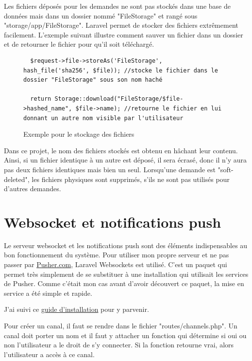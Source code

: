 \documentclass[
    iai, %
    eai, %
]{heig-tb}
\begin{document}
\newpage
Les fichiers déposés pour les demandes ne sont pas stockés dans une base de données mais dans un dossier nommé "FileStorage" et rangé sous "storage/app/FileStorage". Laravel permet de stocker des fichiers extrêmement facilement. L'exemple suivant illustre comment sauver un fichier dans un dossier et de retourner le fichier pour qu'il soit téléchargé.

\begin{figure}[h]
  \begin{verbatim}
  $request->file->storeAs('FileStorage', hash_file('sha256', $file)); //stocke le fichier dans le dossier "FileStorage" sous son nom haché

  return Storage::download("FileStorage/$file->hashed_name", $file->name); //retourne le fichier en lui donnant un autre nom visible par l'utilisateur
  \end{verbatim}
  \caption{Exemple pour le stockage des fichiers}
\end{figure}

Dans ce projet, le nom des fichiers stockés est obtenu en hâchant leur contenu. Ainsi, si un fichier identique à un autre est déposé, il sera écrasé, donc il n'y aura pas deux fichiers identiques mais bien un seul. Lorsqu'une demande est "soft-deleted", les fichiers physiques sont supprimés, s'ils ne sont pas utilisés pour d'autres demandes.

\section{Websocket et notifications push}
Le serveur websocket et les notifications push sont des éléments indispensables au bon fonctionnement du système. Pour utiliser mon propre serveur et ne pas passer par \href{https://pusher.com/}{Pusher.com}, Laravel Websockets est utilisé. C'est un paquet qui permet très simplement de se substituer à une installation qui utilisait les services de Pusher. Comme c'était mon cas avant d'avoir découvert ce paquet, la mise en service a été simple et rapide.

J'ai suivi ce \href{https://beyondco.de/docs/laravel-websockets/getting-started/installation}{guide d'installation} pour y parvenir.

Pour créer un canal, il faut se rendre dans le fichier "routes/channels.php". Un canal doit porter un nom et il faut y attacher un fonction qui détermine si oui ou non l'utilisateur a le droit de s'y connecter. Si la fonction retourne vrai, alors l'utilisateur a accès à ce canal.
\end{document}
